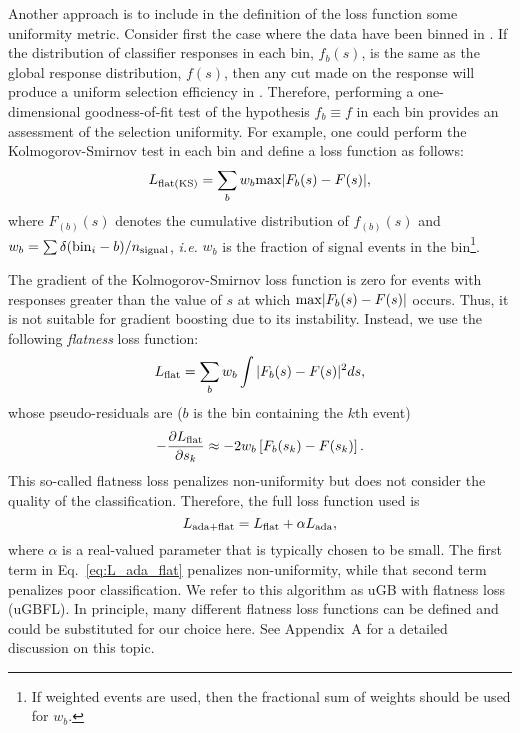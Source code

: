 Another approach is to include in the definition of the loss function some uniformity metric.  Consider first the case where the data have been binned in \y.  If the distribution of classifier responses in each bin, $f_b(s)$, is the same as the global response distribution, $f(s)$, then any cut made on the response will produce a uniform selection efficiency in \y.  Therefore, performing a one-dimensional goodness-of-fit test of the hypothesis $f_b \equiv f$ in each bin provides an assessment of the selection uniformity.  
For example, one could perform the Kolmogorov-Smirnov test in each bin and define a loss function as follows:
\begin{equation}
  L_{\rm flat(KS)} = \sum\limits_{b} w_b {\rm max}|F_b(s)-F(s)|,
\end{equation}
where $F_{(b)}(s)$ denotes the cumulative distribution of $f_{(b)}(s)$ and $w_b = \sum \delta({\rm bin}_i - b)/n_{\rm signal}$, {\em i.e.} $w_b$ is the fraction of signal events in the bin\footnote{If weighted events are used, then the fractional sum of weights should be used for $w_b$.}.   

The gradient of the Kolmogorov-Smirnov loss function is zero for events with responses greater than the value of $s$ at which ${\rm max}|F_b(s)-F(s)|$ occurs.  Thus, it is not suitable for gradient boosting due to its instability.  Instead, we use the following {\em flatness} loss function:
\begin{equation}
  L_{\rm flat} = \sum\limits_{b} w_b \int |F_b(s)-F(s)|^2 ds,
\end{equation}
whose pseudo-residuals are ($b$ is the bin containing the $k$th event)
\begin{equation}
 -\frac{\partial L_{\rm flat}}{\partial s_k} \approx - 2 w_b \left[F_b(s_k)-F(s_k)\right] .
\end{equation}
This so-called flatness loss penalizes non-uniformity but does not consider the quality of the classification.  Therefore, the full loss function used is 
\begin{equation}
\label{eq:L_ada_flat}
  L_{{\rm ada}+{\rm flat}} = L_{\rm flat} + \alpha L_{\rm ada},
\end{equation}  
where $\alpha$ is a real-valued parameter that is typically chosen to be small.  The first term in Eq.~\ref{eq:L_ada_flat} penalizes non-uniformity, while that second term penalizes poor classification.  
We refer to this algorithm as uGB with flatness loss (uGBFL). 
In principle, many different flatness loss functions can be defined and could be substituted for our choice here.  See Appendix~A for a detailed discussion on this topic. 

